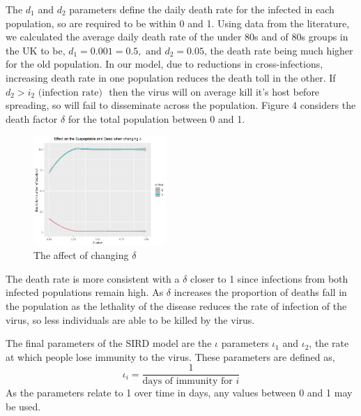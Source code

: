 \documentclass{article}
\begin{document}
\noindent
The $d_1$ and $d_2$ parameters define the daily death rate for the infected in each population, so are required to be within 0 and 1. Using data from the literature, we calculated the average daily death rate of the under 80s and of 80s groups in the UK to be, $d_1 = 0.001= 0.5,\text{ and } d_2 = 0.05$, the death rate being much higher for the old population. In our model, due to %
reductions in cross-infections, increasing death rate in one population reduces the death toll in the other. If $d_2 > i_2\text{ (infection rate) }$ then the virus will on average kill it's host before spreading, so will fail to disseminate across the population. Figure 4 considers the death factor $\delta$ for the total population between 0 and 1.

\begin{figure}[ht!]
\begin{center}
      \includegraphics[width=0.45\textwidth]{./figures/MarioPlt/dSusDed.png}
      \end{center}
\caption{The affect of changing $\delta$}
\end{figure}



\noindent
The death rate is more consistent with a $\delta$ closer to 1
since infections from both infected populations remain high. 
As $\delta$ increases the proportion of deaths fall in the population as the lethality of the disease reduces the rate of infection of the virus, so less individuals are able to be killed by the virus.





\noindent
The final parameters of the SIRD model are the $\iota$ parameters $\iota_1$ and $\iota_2$, the rate at which people lose immunity to the virus. These parameters are defined as,
$$\iota_i = \displaystyle{\frac{1}{\text{days of immunity for $i$}}}$$ 
As the parameters relate to 1 over time in days, any values between 0 and 1 may be used.
\end{document}
